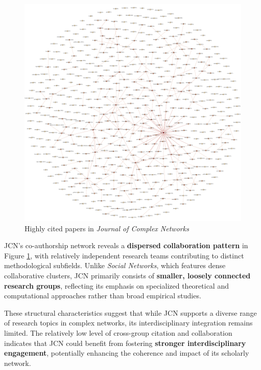 \documentclass[twocolumn]{article}
\begin{document}
	
	\begin{figure}[htbp]
		\centering
		\includegraphics[width=\columnwidth]{"Journal of Complex Networks/Gephi/highly_cited.pdf"}
		\caption{Highly cited papers in \textit{Journal of Complex Networks}}
		\label{fig.fig6}
	\end{figure}
	
	JCN's co-authorship network reveals a \textbf{dispersed collaboration pattern} in Figure \ref{fig.fig6}, with relatively independent research teams contributing to distinct methodological subfields. Unlike \textit{Social Networks}, which features dense collaborative clusters, JCN primarily consists of \textbf{smaller, loosely connected research groups}, reflecting its emphasis on specialized theoretical and computational approaches rather than broad empirical studies.
	
	These structural characteristics suggest that while JCN supports a diverse range of research topics in complex networks, its interdisciplinary integration remains limited. The relatively low level of cross-group citation and collaboration indicates that JCN could benefit from fostering \textbf{stronger interdisciplinary engagement}, potentially enhancing the coherence and impact of its scholarly network.
	
\end{document}
